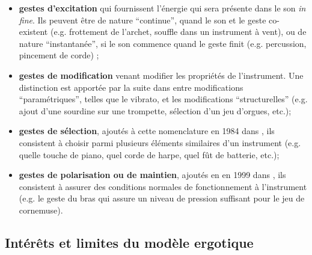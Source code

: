 	\begin{itemize}[noitemsep]
		\item \textbf{gestes d'excitation} qui fournissent l'énergie qui sera présente dans le son \textit{in fine}. Ils peuvent être de nature ``continue'', quand le son et le geste co-existent (e.g. frottement de l'archet, souffle dans un instrument à vent), ou de nature ``instantanée'', si le son commence quand le geste finit (e.g. percussion, pincement de corde) \cite{cadoz_gesture_2000};
		\item \textbf{gestes de modification} venant modifier les propriétés de l'instrument. Une distinction est apportée par la suite dans \cite{cadoz_synthese_1983} entre modifications ``paramétriques'', telles que le vibrato, et les modifications ``structurelles'' (e.g. ajout d'une sourdine sur une trompette, sélection d'un jeu d'orgues, etc.);
		\item \textbf{gestes de sélection}, ajoutés à cette nomenclature en 1984 dans \cite{luciani_modelisation_1984}, ils consistent à choisir parmi plusieurs éléments similaires d'un instrument (e.g. quelle touche de piano, quel corde de harpe, quel fût de batterie, etc.);
		\item \textbf{gestes de polarisation ou de maintien}, ajoutés en en 1999 dans \cite{cadoz_gesture_2000}, ils consistent à assurer des conditions normales de fonctionnement à l'instrument (e.g. le geste du bras qui assure un niveau de pression suffisant pour le jeu de cornemuse).
\end{itemize}

\subsection{Intérêts et limites du modèle ergotique}

